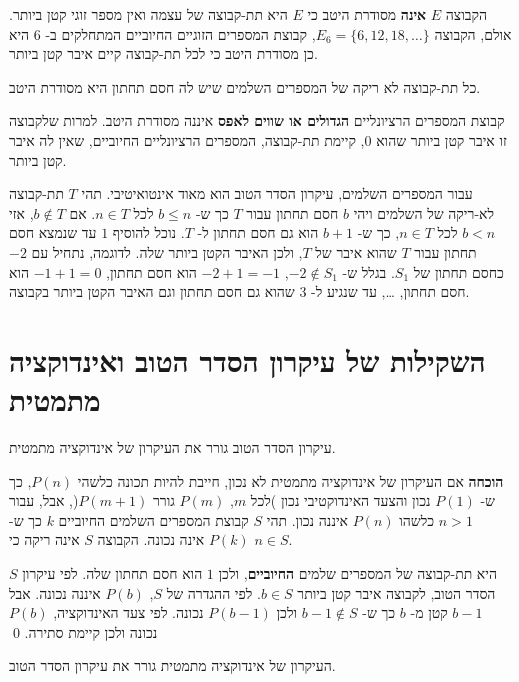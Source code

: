 הקבוצה
$E$
\textbf{אינה}
מסודרת היטב כי 
$E$
היא תת-קבוצה של עצמה ואין מספר זוגי קטן ביותר. אולם, הקבוצה
$E_6=\{6,12,18,\ldots\}$,
קבוצת המספרים הזוגיים החיוביים המתחלקים ב-%
$6$
היא כן מסודרת היטב כי לכל תת-קבוצה קיים איבר קטן ביותר.

\begin{axiom}
כל תת-קבוצה לא ריקה של המספרים השלמים שיש לה חסם תחתון היא מסודרת היטב.
\end{axiom}

קבוצת המספרים הרציונליים
\textbf{הגדולים או שווים לאפס}
איננה מסודרת היטב. למרות שלקבוצה זו איבר קטן ביותר שהוא 
$0$,
קיימת תת-קבוצה, המספרים הרציונליים החיוביים, שאין לה איבר קטן ביותר.

עבור המספרים השלמים, עיקרון הסדר הטוב הוא מאוד אינטואיטיבי. תהי 
$T$
תת-קבוצה לא-ריקה של השלמים ויהי
$b$
חסם תחתון עבור 
$T$
כך ש-%
$b\leq n$
לכל
$n\in T$.
אם 
$b\not\in T$,
אזי
$b<n$
לכל
$n\in T$,
כך ש-%
$b+1$
הוא גם חסם תחתון ל-%
$T$.
נוכל להוסיף
$1$
עד שנמצא חסם תחתון עבור
$T$
שהוא איבר של
$T$,
ולכן האיבר הקטן ביותר שלה. לדוגמה, נתחיל עם
$-2$
כחסם תחתון של 
$S_1$.
בגלל ש-%
$-2\not\in S_1$,
$-2+1=-1$
הוא חסם תחתון,
$-1+1=0$
הוא חסם תחתון,
\ldots,
עד שנגיע ל-%
$3$
שהוא גם חסם תחתון וגם האיבר הקטן ביותר בקבוצה.

\section{%
השקילות של עיקרון הסדר הטוב ואינדוקציה מתמטית%
}

\begin{theorem}\label{th.wop}
עיקרון הסדר הטוב גורר את העיקרון של אינדוקציה מתמטית.
\end{theorem}

\textbf{הוכחה}
אם העיקרון של אינדוקציה מתמטית לא נכון, חייבת להיות תכונה כלשהי
$P(n)$,
כך ש-%
$P(1)$
נכון והצעד האינדוקטיבי נכון )לכל
$m$, $P(m)$
גורר
$P(m+1)$(,
אבל, עבור
$n>1$
כלשהו
$P(n)$
איננה נכון. תהי
$S$
קבוצת המספרים השלמים החיוביים
$k$
כך ש-%
$P(k)$
אינה נכונה. הקבוצה
$S$
אינה ריקה כי
$n\in S$.

$S$
היא תת-קבוצה של המספרים שלמים
\textbf{החיוביים},
ולכן
$1$
הוא חסם תחתון שלה. לפי עיקרון הסדר הטוב, לקבוצה איבר קטן ביותר
$b\in S$.
לפי ההגדרה של
$S$, $P(b)$
איננה נכונה. אבל
$b-1$
קטן מ-%
$b$
כך ש-%
$b-1\not\in S$
ולכן
$P(b-1)$
נכונה. לפי צעד האינדוקציה,
$P(b)$
נכונה ולכן קיימת סתירה.
\qed

\begin{theorem}
העיקרון של אינדוקציה מתמטית גורר את עיקרון הסדר הטוב.
\end{theorem}

